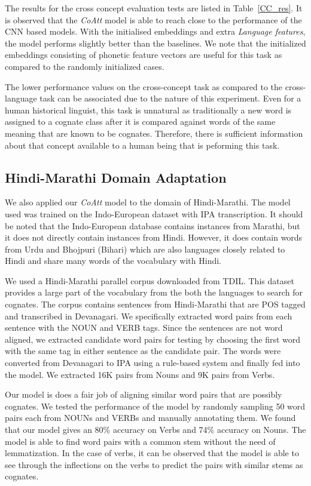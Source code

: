 \documentclass[11pt,letterpaper]{article}
\begin{document}
The results for the cross concept evaluation tests are listed in Table~\ref{CC_res}. It is observed that the \textit{CoAtt} model is able to reach close to the performance of the CNN based models. With the initialised embeddings and extra \textit{Language features}, the model performs slightly better than the baselines. We note that the initialized embeddings consisting of phonetic feature vectors are useful for this task as compared to the randomly initialized cases. 

The lower performance values on the cross-concept task as compared to the cross-language task can be associated due to the nature of this experiment.  Even for a human historical linguist, this task is unnatural as traditionally a new word is assigned to a cognate class after it is compared against words of the same meaning that are known to be cognates. Therefore, there is sufficient information about that concept available to a human being that is peforming this task. 

\subsection{Hindi-Marathi Domain Adaptation}

We also applied our \textit{CoAtt} model to the domain of Hindi-Marathi. The model used was trained on the Indo-European dataset with IPA transcription. It should be noted that the Indo-European database contains instances from Marathi, but it does not directly contain instances from Hindi. However, it does contain words from Urdu and Bhojpuri (Bihari) which are also languages closely related to Hindi and share many words of the vocabulary with Hindi.

We used a Hindi-Marathi parallel corpus downloaded from TDIL. This dataset provides a large part of the vocabulary from the both the languages to search for cognates. The corpus contains sentences from Hindi-Marathi that are POS tagged and transcribed in Devanagari. We specifically extracted word pairs from each sentence with the NOUN and VERB tags. Since the sentences are not word aligned, we extracted candidate word pairs for testing by choosing the first word with the same tag in either sentence as the candidate pair. The words were converted from Devanagari to IPA using a rule-based system and finally fed into the model. We extracted 16K pairs from Nouns and 9K pairs from Verbs.

Our model is does a fair job of aligning similar word pairs that are possibly cognates. We tested the performance of the model by randomly sampling 50 word pairs each from NOUNs and VERBs and manually annotating them. We found that our model gives an 80\% accuracy on Verbs and 74\% accuracy on Nouns. The model is able to find word pairs with a common stem without the need of lemmatization. In the case of verbs, it can be observed that the model is able to see through the inflections on the verbs to predict the pairs with similar stems as cognates. 
\end{document}
